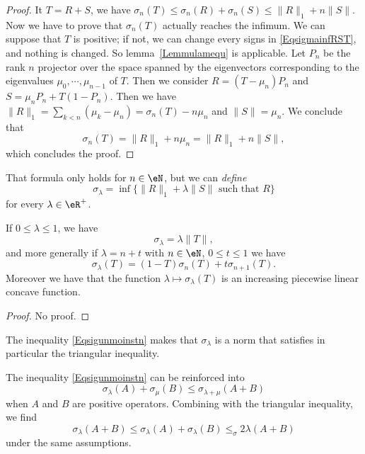 \begin{proof}
	It $T=R+S$, we have $\sigma_n(T)\leq\sigma_n(R)+\sigma_n(S)\leq \| R \|_1+n\| S \|$. Now we have to prove that $\sigma_n(T)$ actually reaches the infimum.  We can suppose that $T$ is positive; if not, we can change every signs in \eqref{EqsigmainfRST}, and nothing is changed. So lemma~\ref{Lemmulamequ} is applicable. Let $P_n$ be the rank $n$ projector over the space spanned by the eigenvectors corresponding to the eigenvalues $\mu_0,\cdots,\mu_{n-1}$ of $T$. Then we consider $R=(T-\mu_n)P_n$ and $S=\mu_nP_n+T(1-P_n)$. Then we have $\| R \|_1=\sum_{k<n}(\mu_k-\mu_n)=\sigma_n(T)-n\mu_n$ and $\| S \|=\mu_n$. We conclude that
	\[
		\sigma_n(T)=\| R \|_1+n\mu_n=\| R \|_1+n\| S \|,
	\]
	which concludes the proof.
\end{proof}
That formula only holds for $n\in\eN$, but we can \emph{define}
\begin{equation}
	\sigma_{\lambda}=\inf\{ \| R \|_1+\lambda\| S \|\text{ such that }R \}
\end{equation}
for every $\lambda\in\eR^{+}$.

\begin{proposition}
	If $0\leq\lambda\leq 1$, we have
	\[
		\sigma_{\lambda}=\lambda\| T \|,
	\]
	and more generally if $\lambda=n+t$ with $n\in\eN$, $0\leq t\leq 1$ we have
	\begin{equation}	\label{Eqsigunmoinstn}
		\sigma_{\lambda}(T)=(1-T)\sigma_n(T)+t\sigma_{n+1}(T).
	\end{equation}
	Moreover we have that the function $\lambda\mapsto\sigma_{\lambda}(T)$ is an increasing piecewise linear concave function.
\end{proposition}
\begin{proof}
	No proof.
\end{proof}
The inequality \eqref{Eqsigunmoinstn} makes that $\sigma_{\lambda}$ is a norm that satisfies in particular the triangular inequality.

\begin{proposition}
	The inequality \eqref{Eqsigunmoinstn} can be reinforced into
	\begin{equation}
		\sigma_{\lambda}(A)+\sigma_{\mu}(B)\leq \sigma_{\lambda+\mu}(A+B)
	\end{equation}
	when $A$ and $B$ are positive operators. Combining with the triangular inequality, we find
	\begin{equation}
		\sigma_{\lambda}(A+B)\leq\sigma_{\lambda}(A)+\sigma_{\lambda}(B)\leq_\sigma{2\lambda}(A+B)
	\end{equation}
	under the same assumptions.
\end{proposition}

